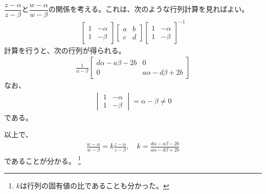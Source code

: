 $\dfrac{z-\alpha}{z-\beta}$と$\dfrac{w-\alpha}{w-\beta}$の関係を考える。これは、次のような行列計算を見ればよい。
\begin{align*}
    \begin{bmatrix}
        1&-\alpha\\
        1&-\beta
    \end{bmatrix}
    \begin{bmatrix}
        a&b\\
        c&d
    \end{bmatrix}
    \begin{bmatrix}
        1&-\alpha\\
        1&-\beta
    \end{bmatrix}^{-1}
\end{align*}
計算を行うと、次の行列が得られる。
\begin{align*}
    \frac{1}{\alpha-\beta}
    \begin{bmatrix}
        d\alpha-a\beta-2b&0\\
        0&a\alpha-d\beta+2b
    \end{bmatrix}
\end{align*}
なお、
\begin{align*}
    \begin{vmatrix}
        1&-\alpha\\
        1&-\beta
    \end{vmatrix}
    =\alpha-\beta\neq0
\end{align*}
である。

以上で、
\begin{align*}
    \frac{w-\alpha}{w-\beta}
    =k\frac{z-\alpha}{z-\beta},\quad
    k=\frac{d\alpha-a\beta-2b}{a\alpha-d\beta+2b}
\end{align*}
であることが分かる。
\footnote{$k$は行列の固有値の比であることも分かった。}

